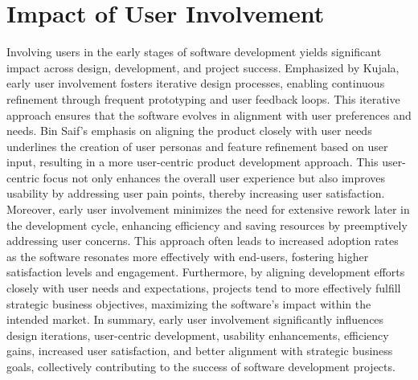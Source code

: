 \documentclass{article}
\begin{document}
\newpage 

\section{Impact of User Involvement}
Involving users in the early stages of software development yields significant impact across design, development, and project success. Emphasized by Kujala, early user involvement fosters iterative design processes, enabling continuous refinement through frequent prototyping and user feedback loops. This iterative approach ensures that the software evolves in alignment with user preferences and needs. Bin Saif's emphasis on aligning the product closely with user needs underlines the creation of user personas and feature refinement based on user input, resulting in a more user-centric product development approach. This user-centric focus not only enhances the overall user experience but also improves usability by addressing user pain points, thereby increasing user satisfaction. Moreover, early user involvement minimizes the need for extensive rework later in the development cycle, enhancing efficiency and saving resources by preemptively addressing user concerns. This approach often leads to increased adoption rates as the software resonates more effectively with end-users, fostering higher satisfaction levels and engagement. Furthermore, by aligning development efforts closely with user needs and expectations, projects tend to more effectively fulfill strategic business objectives, maximizing the software's impact within the intended market. In summary, early user involvement significantly influences design iterations, user-centric development, usability enhancements, efficiency gains, increased user satisfaction, and better alignment with strategic business goals, collectively contributing to the success of software development projects.
\newpage
\end{document}
